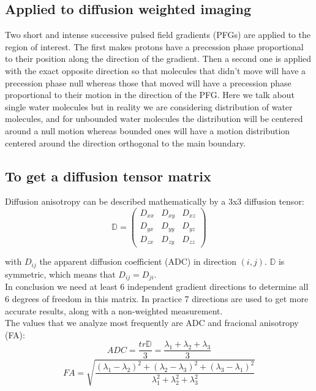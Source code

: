 \subsection{Applied to diffusion weighted imaging}

Two short and intense successive pulsed field gradients (PFGs) are applied to the region of interest. The first makes protons have a precession phase proportional to their position along the direction of the gradient. Then a second one is applied with the exact opposite direction so that molecules that didn't move will have a precession phase null whereas those that moved will have a precession phase proportional to their motion in the direction of the PFG. Here we talk about single water molecules but in reality we are considering distribution of water molecules, and for unbounded water molecules the distribution will be centered around a null motion whereas bounded ones will have a motion distribution centered around the direction orthogonal to the main boundary.

\subsection{To get a diffusion tensor matrix}

Diffusion anisotropy can be described mathematically by a 3x3 diffusion tensor:
\begin{equation}
    \mathbb{D} = \begin{pmatrix}
    D_{xx} & D_{xy} & D_{xz} \\
    D_{yx} & D_{yy} & D_{yz} \\
    D_{zx} & D_{zy} & D_{zz}
    \end{pmatrix}
\end{equation}

with $D_{ij}$ the apparent diffusion coefficient (ADC) in direction $(i, j)$. $\mathbb{D}$ is symmetric, which means that $D_{ij} = D_{ji}$.\\
In conclusion we need at least 6 independent gradient directions to determine all 6 degrees of freedom in this matrix. In practice 7 directions are used to get more accurate results, along with a non-weighted measurement.\\
The values that we analyze most frequently are ADC and fracional anisotropy (FA):
\begin{equation}
    ADC = \frac{tr{\mathbb{D}}}{3} = \frac{\lambda_1 + \lambda_2 + \lambda_3}{3}
\end{equation}
\begin{equation}
    FA = \sqrt{\frac{(\lambda_1 - \lambda_2)^2 + (\lambda_2 - \lambda_3)^2 + (\lambda_3 - \lambda_1)^2}{\lambda_1^2 + \lambda_2^2 + \lambda_3^2}}
\end{equation}

